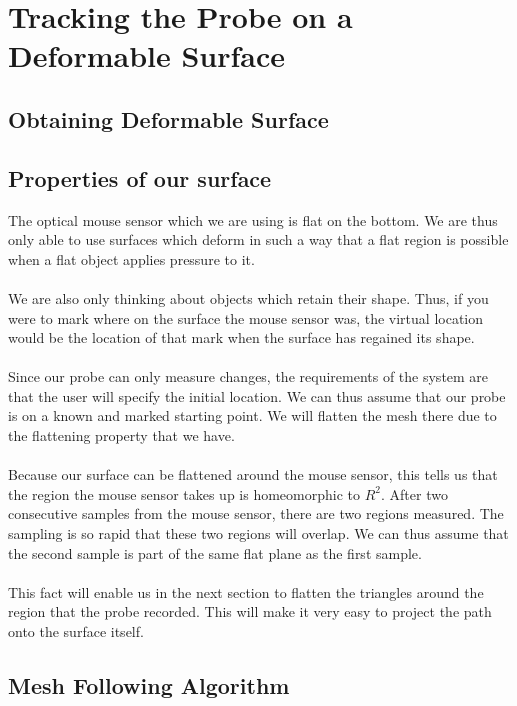 \section{Tracking the Probe on a Deformable Surface}

\subsection{Obtaining Deformable Surface}



\subsection{Properties of our surface}

The optical mouse sensor which we are using is flat on the bottom. We are thus only able to use surfaces which deform in such a way that a flat region is possible when a flat object applies pressure to it. \\
\\
We are also only thinking about objects which retain their shape. Thus, if you were to mark where on the surface the mouse sensor was, the virtual location would be the location of that mark when the surface has regained its shape. \\
\\
Since our probe can only measure changes, the requirements of the system are that the user will specify the initial location. We can thus assume that our probe is on a known and marked starting point. We will flatten the mesh there due to the flattening property that we have. \\
\\
Because our surface can be flattened around the mouse sensor, this tells us that the region the mouse sensor takes up is homeomorphic to $R^2$. After two consecutive samples from the mouse sensor, there are two regions measured. The sampling is so rapid that these two regions will overlap. We can thus assume that the second sample is part of the same flat plane as the first sample. \\
\\
This fact will enable us in the next section to flatten the triangles around the region that the probe recorded. This will make it very easy to project the path onto the surface itself. 

\subsection{Mesh Following Algorithm}

